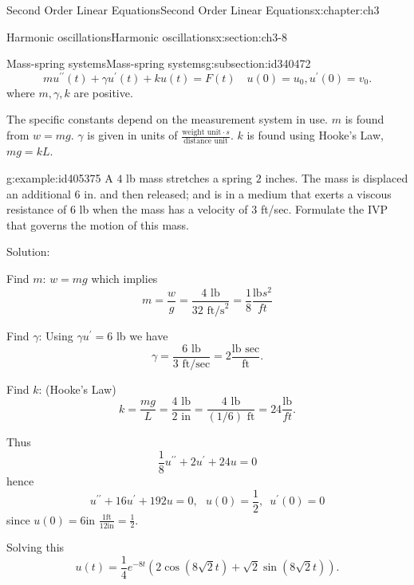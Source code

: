 \documentclass[oneside,10pt,]{book}
\numberwithin{equation}{section}
\numberwithin{equation}{section}
\begin{document}
\begin{chapterptx}{Second Order Linear Equations}{}{Second Order Linear Equations}{}{}{x:chapter:ch3}
\begin{sectionptx}{Harmonic oscillations}{}{Harmonic oscillations}{}{}{x:section:ch3-8}
\begin{subsectionptx}{Mass-spring systems}{}{Mass-spring systems}{}{}{g:subsection:id340472}
\begin{equation*}
mu^{\prime\prime}(t)+\gamma u^{\prime}(t)+ku(t)=F(t)\,\,\,\,\,\,u(0)=u_{0},u^{\prime}(0)=v_{0}.
\end{equation*}
where \(m,\gamma,k\) are positive.%
\par
The specific constants depend on the measurement system in use. \(m\) is found from \(w=mg\). \(\gamma\) is given in units of \(\frac{\text{weight unit} \cdot s}{\text{distance unit}}\).  \(k\) is found using Hooke's Law, \(mg=kL\).%
\begin{example}{}{g:example:id405375}%
A \(4\) lb mass stretches a spring \(2\) inches. The mass is displaced an additional 6 in. and then released; and is in a medium that exerts a viscous resistance of \(6\) lb when the mass has a velocity of \(3\) ft\slash{}sec. Formulate the IVP that governs the motion of this mass.%
\par
Solution:%
\par
Find \(m\): \(w=mg\) which implies%
\begin{equation*}
m=\frac{w}{g}=\frac{4\text{ lb}}{32\text{ ft/s}^2}=\frac{1}{8}\frac{\text{lb}s^{2}}{ft}
\end{equation*}
%
\par
Find \(\gamma\): Using \(\gamma u^{\prime}=6\) lb we have%
\begin{equation*}
\gamma=\frac{6\text{ lb}}{3\text{ ft/sec}}=2\frac{\text{lb sec}}{\text{ft}}.
\end{equation*}
%
\par
Find \(k\): (Hooke's Law)%
\begin{equation*}
k=\frac{mg}{L}=\frac{4\text{ lb}}{2\text{ in}}=\frac{4\text{ lb}}{(1/6)\text{ ft}}=24\frac{\text{lb}}{ft}.
\end{equation*}
%
\par
Thus%
\begin{equation*}
\frac{1}{8}u^{\prime\prime}+2u^{\prime}+24u=0
\end{equation*}
hence%
\begin{equation*}
u^{\prime\prime}+16u^{\prime}+192u=0,\,\,\,\,u(0)=\frac{1}{2},\,\,\,u^{\prime}(0)=0
\end{equation*}
since \(u(0)=6\text{in }\frac{1\text{ft}}{12\text{in}}=\frac{1}{2}\).%
\par
Solving this%
\begin{equation*}
u(t)=\frac{1}{4}e^{-8t}\left(2\cos\left(8\sqrt{2}t\right)+\sqrt{2}\sin\left(8\sqrt{2}t\right)\right).
\end{equation*}
%
\begin{image}{0}{1}{0}%

\end{image}
\end{example}
\end{subsectionptx}
\end{sectionptx}
\end{chapterptx}
\end{document}
